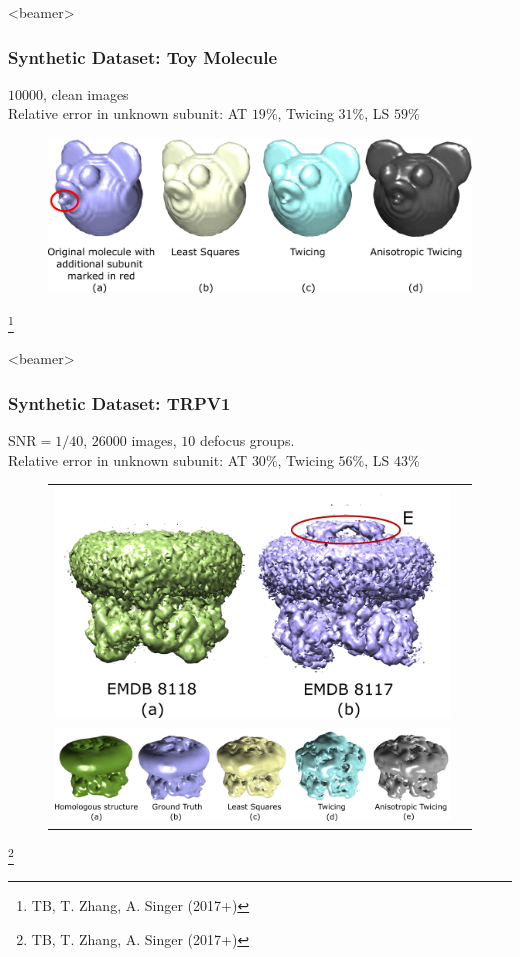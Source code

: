 \documentclass{beamer}
\newcommand\blfootnote[1]{%
  \begingroup
  \renewcommand\thefootnote{}\footnote{#1}%
  \addtocounter{footnote}{-1}%
  \endgroup
}
\begin{document}
\begin{frame}<beamer>
\frametitle{Synthetic Dataset: Toy Molecule }
$10000$, clean images\\
Relative error in unknown subunit: AT $19\%$, Twicing $31\%$, LS $59\%$ 
\begin{figure}[!htbp]
\begin{center}
\includegraphics[scale=0.16]{figures/mickey.pdf}
\end{center}
\end{figure}\blfootnote{TB, T. Zhang, A. Singer (2017+)}

\end{frame}

\begin{frame}<beamer>
\frametitle{Synthetic Dataset: TRPV1 }
SNR$=1/40$, $26000$ images, $10$ defocus groups.\\ 
Relative error in unknown subunit: AT $30\%$, Twicing $56\%$, LS $43\%$ 
\begin{figure}[!htbp]
\begin{tabular}{cc}
\includegraphics[width=0.4\linewidth]{figures/sim8117_compare.pdf}\label{fig:simtrpv_emdb} \\
\includegraphics[width=0.9\linewidth]{figures/sim8117.pdf}\label{fig:simtrpv_res}\\
\end{tabular}
\end{figure}\blfootnote{TB, T. Zhang, A. Singer (2017+)}

\end{frame}
\end{document}
